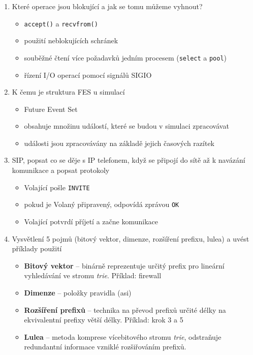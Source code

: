 \documentclass[12pt,a4paper,titlepage,final]{article}
\begin{document}
\begin{enumerate}
	\item Které operace jsou blokující a jak se tomu můžeme vyhnout?
	\begin{itemize}
		\item \texttt{accept()} a \texttt{recvfrom()}
		\item použití neblokujících schránek
		\item souběžné čtení více požadavků jedním procesem (\texttt{select} a \texttt{pool})
		\item řízení I/O operací pomocí signálů SIGIO 	
	\end{itemize}

	\item K čemu je struktura FES u simulací
	\begin{itemize}
		\item Future Event Set
		\item obsahuje množinu událostí, které se budou v simulaci zpracovávat
		\item události jsou zpracovávány na základě jejich časových razítek	
	\end{itemize}

	\item SIP, popsat co se děje s IP telefonem, když se připojí do sítě až k navázání komunikace a popsat protokoly
	\begin{itemize}
		\item Volající pošle \texttt{INVITE}
		\item pokud je Volaný připravený, odpovídá zprávou \texttt{OK}  	
		\item Volající potvrdí příjetí a začne komunikace
	\end{itemize}		

	\item Vysvětlení 5 pojmů (bitový vektor, dimenze, rozšíření prefixu, lulea) a uvést příklady použití
	\begin{itemize}
		\item \textbf{Bitový vektor} -- binárně reprezentuje určitý prefix pro lineární vyhledávání ve stromu \emph{trie}. Příklad: firewall
		\item \textbf{Dimenze} -- položky pravidla (asi)
		\item \textbf{Rozšíření prefixů} -- technika na převod prefixů určité délky na ekvivalentní prefixy větší délky. Příklad: krok 3 a 5
		\item \textbf{Lulea} -- metoda komprese vícebitového stromu \emph{trie}, odstraňuje redundantní informace vzniklé rozšiřováním prefixů.
	\end{itemize}


\end{enumerate}
\end{document}
